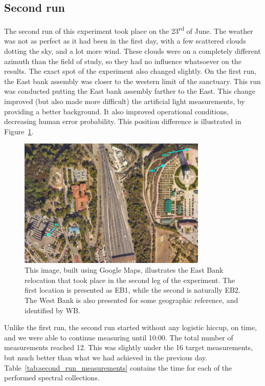 \subsection{Second run}%
\label{sub:second_run}

The second run of this experiment took place on the
23\textsuperscript{rd} of June. The weather was not as perfect as it had
been in the first day, with a few scattered clouds dotting the sky, and
a lot more wind. These clouds were on a completely different azimuth
than the field of study, so they had no influence whatsoever on the
results. The exact spot of the experiment also changed slightly. On the
first run, the East bank assembly was closer to the western limit of the
sanctuary. This run was conducted putting the East bank assembly farther
to the East. This change improved (but also made more difficult) the
artificial light measurements, by providing a better background. It also
improved operational conditions, decreasing human error probability.
This position difference is illustrated in
Figure~\ref{fig:changing_position}.

\begin{figure}[htpb]
    \centering
    \includegraphics[width=0.8\textwidth]{img/png/eastbank_changed.png}
    \caption{This image, built using Google Maps, illustrates the East
    Bank relocation that took place in the second leg of the experiment.
    The first location is presented as EB1, while the second is naturally
    EB2. The West Bank is also presented for some geographic reference, and
    identified by WB.}
    \label{fig:changing_position}
\end{figure}

Unlike the first run, the second run started without any logistic
hiccup, on time, and we were able to continue measuring until 10:00.
The total number of measurements reached 12. This was slightly under the
16 target measurements, but much better than what we had achieved in the
previous day. Table~\ref{tab:second_run_measurements} contains the time
for each of the performed spectral collections.


